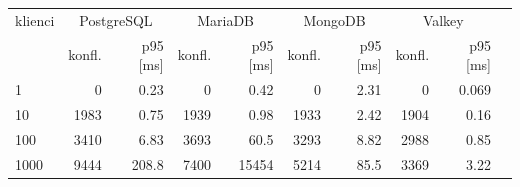 \begin{tabular}{lrrrrrrrrr}
\toprule
klienci & \multicolumn{2}{c}{PostgreSQL} & \multicolumn{2}{c}{MariaDB} & \multicolumn{2}{c}{MongoDB} & \multicolumn{2}{c}{Valkey} \\
 & konfl. & p95 [ms] & konfl. & p95 [ms] & konfl. & p95 [ms] & konfl. & p95 [ms] \\
\midrule
1 & \num{0} & \num{0.23} & \num{0} & \num{0.42} & \num{0} & \num{2.31} & \num{0} & \num{0.069} \\
10 & \num{1983} & \num{0.75} & \num{1939} & \num{0.98} & \num{1933} & \num{2.42} & \num{1904} & \num{0.16} \\
100 & \num{3410} & \num{6.83} & \num{3693} & \num{60.5} & \num{3293} & \num{8.82} & \num{2988} & \num{0.85} \\
1000 & \num{9444} & \num{208.8} & \num{7400} & \num{15454} & \num{5214} & \num{85.5} & \num{3369} & \num{3.22} \\
\bottomrule
\end{tabular}
